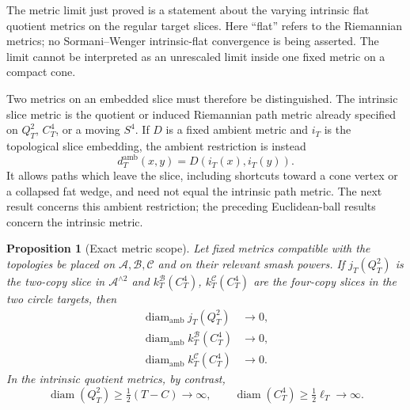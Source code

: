 \documentclass[11pt,letterpaper]{article}
\numberwithin{equation}{section}
\newtheorem{proposition}[theorem]{Proposition}
\theoremstyle{definition}
\theoremstyle{remark}
\begin{document}
The metric limit just proved is a statement about the varying intrinsic
flat quotient metrics on the regular target slices.  Here ``flat'' refers
to the Riemannian metrics; no Sormani--Wenger intrinsic-flat convergence
is being asserted.  The limit cannot be interpreted as an unrescaled
limit inside one fixed metric on a compact cone.

Two metrics on an embedded slice must therefore be distinguished.  The
intrinsic slice metric is the quotient or induced Riemannian path metric
already specified on \(Q_T^2\), \(C_T^4\), or a moving \(S^4\).  If \(D\)
is a fixed ambient metric and \(i_T\) is the topological slice embedding,
the ambient restriction is instead
\[
 d^{\mathrm{amb}}_T(x,y)=D(i_T(x),i_T(y)).
\]
It allows paths which leave the slice, including shortcuts toward a cone
vertex or a collapsed fat wedge, and need not equal the intrinsic path
metric.  The next result concerns this ambient restriction; the preceding
Euclidean-ball results concern the intrinsic metric.

\begin{proposition}[Exact metric scope]
\label{prop:metric-scope}
Let fixed metrics compatible with the topologies be placed on
$\mathcal A,\mathcal B,\mathcal C$ and on their relevant smash powers.
If $j_T(Q_T^2)$ is the two-copy slice in
$\mathcal A^{\wedge2}$ and
$k_T^{\mathcal B}(C_T^4)$,
$k_T^{\mathcal C}(C_T^4)$ are the four-copy slices in the two circle
targets, then
\begin{equation}
 \begin{aligned}
 \operatorname{diam}_{\mathrm{amb}}j_T(Q_T^2)&\longrightarrow0,\\
 \operatorname{diam}_{\mathrm{amb}}k_T^{\mathcal B}(C_T^4)&\longrightarrow0,\\
 \operatorname{diam}_{\mathrm{amb}}k_T^{\mathcal C}(C_T^4)&\longrightarrow0.
 \end{aligned}
 \label{eq:ambient-collapse}
\end{equation}
In the intrinsic quotient metrics, by contrast,
\begin{equation}
 \operatorname{diam}(Q_T^2)\ge\tfrac12(T-C)\longrightarrow\infty,
 \qquad
 \operatorname{diam}(C_T^4)\ge\tfrac12\ell_T\longrightarrow\infty.
 \label{eq:intrinsic-expansion}
\end{equation}
\end{proposition}
\end{document}
